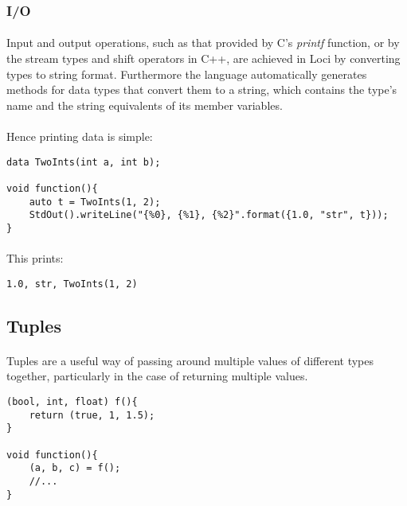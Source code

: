 \documentclass[12pt,twoside,notitlepage]{report}
\begin{document}
\subsubsection{I/O}

\paragraph{}
Input and output operations, such as that provided by C's \emph{printf} function, or by the stream types and shift operators in C++, are achieved in Loci by converting types to string format. Furthermore the language automatically generates methods for data types that convert them to a string, which contains the type's name and the string equivalents of its member variables.

\paragraph{}
Hence printing data is simple:

\begin{lstlisting}
data TwoInts(int a, int b);

void function(){
	auto t = TwoInts(1, 2);
	StdOut().writeLine("{%0}, {%1}, {%2}".format({1.0, "str", t}));
}
\end{lstlisting}

\paragraph{}
This prints:

\begin{verbatim}
1.0, str, TwoInts(1, 2)
\end{verbatim}

\subsection{Tuples}

\paragraph{}
Tuples are a useful way of passing around multiple values of different types together, particularly in the case of returning multiple values.

\begin{lstlisting}
(bool, int, float) f(){
	return (true, 1, 1.5);
}

void function(){
	(a, b, c) = f();
	//...
}
\end{lstlisting}
\end{document}
